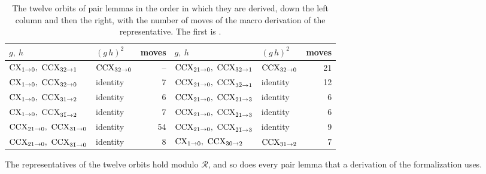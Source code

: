 \documentclass[acmsmall,screen,nonacm]{acmart}
\begin{document}
\begin{table}[htbp]
\small
\centering
\caption{The twelve orbits of pair lemmas in the order in which they are derived, down the left column and then the right, with the number of moves of the macro derivation of the representative. The first is .}
\label{tab:xcxccx-pairs}
\begin{tabular}{@{}llr@{\qquad\qquad}llr@{}}
\toprule
$g,\ h$ & $(g\,h)^2$ & moves & $g,\ h$ & $(g\,h)^2$ & moves\\
\midrule
$\CX_{1\to0},\ \CCX_{32\to1}$ & $\mathrm{CCX}_{32\to0}$ & -- & $\CCX_{21\to0},\ \CCX_{32\to1}$ & $\mathrm{CCX}_{32\to0}$ & 21\\
$\CX_{1\to0},\ \CCX_{32\to0}$ & identity & 7 & $\CCX_{21\to0},\ \CCX_{3\bar2\to1}$ & identity & 12\\
$\CX_{1\to0},\ \CCX_{31\to2}$ & identity & 6 & $\CCX_{21\to0},\ \CCX_{21\to3}$ & identity & 6\\
$\CX_{1\to0},\ \CCX_{3\bar1\to2}$ & identity & 7 & $\CCX_{21\to0},\ \CCX_{\bar21\to3}$ & identity & 6\\
$\CCX_{21\to0},\ \CCX_{31\to0}$ & identity & 54 & $\CCX_{21\to0},\ \CCX_{\bar2\bar1\to3}$ & identity & 9\\
$\CCX_{21\to0},\ \CCX_{3\bar1\to0}$ & identity & 8 & $\CX_{1\to0},\ \CCX_{30\to2}$ & $\mathrm{CCX}_{31\to2}$ & 7\\
\bottomrule
\end{tabular}
\end{table}

\begin{proposition}\label{prop:x-pairs}
The representatives of the twelve orbits hold modulo $\mathcal{R}$, and so does every pair lemma that a derivation of the formalization uses.
\end{proposition}
\end{document}

